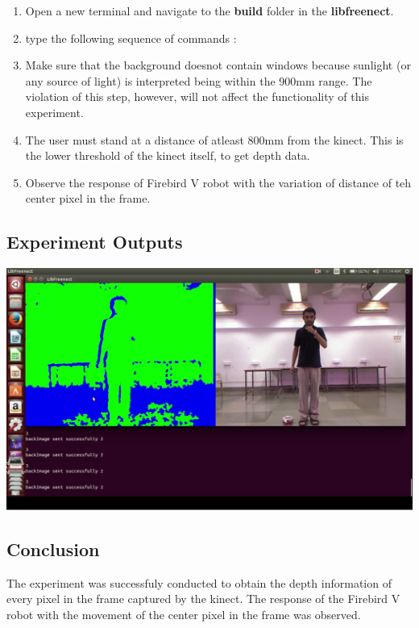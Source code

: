 \begin{flushleft}
\begin{enumerate}
\item Open a new terminal and navigate to the \textbf{build} folder in the \textbf{libfreenect}.
\item type the following sequence of commands :
\item Make sure that the background doesnot contain windows because sunlight (or any source of light) is interpreted being within the 900mm range. The violation of this step, however, will not affect the functionality of this experiment.
\item The user must stand at a distance of atleast 800mm from the kinect. This is the lower threshold of the kinect itself, to get depth data.
\item Observe the response of Firebird V robot with the variation of distance of teh center pixel in the frame.

\end{enumerate}
\medskip
\subsection{\textbf{ Experiment Outputs}}

\includegraphics[scale = 0.5]{e131}

\medskip
\subsection{\textbf{ Conclusion}}
The experiment was successfuly conducted to obtain the depth information of every pixel in the frame captured by the kinect. The response of the Firebird V robot with the movement of the center pixel in the frame was observed.
\medskip
\newpage


\end{flushleft}
